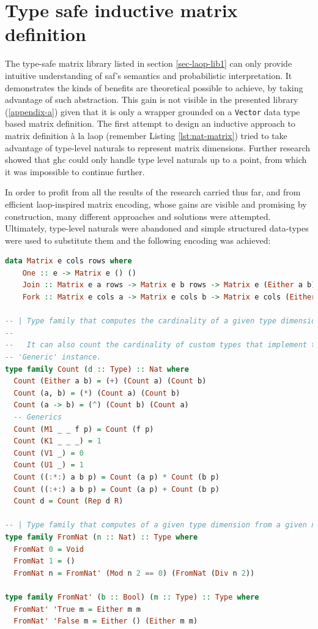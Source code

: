 \documentclass[
  oneside,
  11pt, a4paper,
  footinclude=true,
  headinclude=true,
  cleardoublepage=empty
]{scrbook}
\theoremstyle{definition}
\theoremstyle{definition}
\begin{document}
	\section{Type safe inductive matrix definition}
	    
        The type-safe matrix library listed in section \ref{sec-laop-lib1} can only provide intuitive understanding of \gls{saf}'s semantics and probabilistic interpretation. It demonstrates the kinds of benefits are theoretical possible to achieve, by taking advantage of such abstraction. This gain is not visible in the presented library (\ref{appendix-a}) given that it is only a wrapper grounded on a \texttt{Vector} data type based matrix definition. The first attempt to design an inductive approach to matrix definition à la \gls{laop} (remember Listing \ref{lst:nat-matrix}) tried to take advantage of type-level naturals to represent matrix dimensions. Further research showed that \gls{ghc} could only handle type level naturals up to a point, from which it was impossible to continue further.
	    
	    In order to profit from all the results of the research carried thus far, and from efficient \gls{laop}-inspired matrix encoding, whose gains are visible and promising by construction, many different approaches and solutions were attempted. Ultimately, type-level naturals were abandoned and simple structured data-types were used to substitute them and the following encoding was achieved:
	    
        \begin{lstlisting}[language=Haskell,label={lst:type-fam}, caption={Inductive Matrix definition},captionpos=b]
data Matrix e cols rows where
    One :: e -> Matrix e () ()
    Join :: Matrix e a rows -> Matrix e b rows -> Matrix e (Either a b) rows
    Fork :: Matrix e cols a -> Matrix e cols b -> Matrix e cols (Either a b)

-- | Type family that computes the cardinality of a given type dimension.
--
--   It can also count the cardinality of custom types that implement the
-- 'Generic' instance.
type family Count (d :: Type) :: Nat where
  Count (Either a b) = (+) (Count a) (Count b)
  Count (a, b) = (*) (Count a) (Count b)
  Count (a -> b) = (^) (Count b) (Count a)
  -- Generics
  Count (M1 _ _ f p) = Count (f p)
  Count (K1 _ _ _) = 1
  Count (V1 _) = 0
  Count (U1 _) = 1
  Count ((:*:) a b p) = Count (a p) * Count (b p)
  Count ((:+:) a b p) = Count (a p) + Count (b p)
  Count d = Count (Rep d R)

-- | Type family that computes of a given type dimension from a given natural
type family FromNat (n :: Nat) :: Type where
  FromNat 0 = Void
  FromNat 1 = ()
  FromNat n = FromNat' (Mod n 2 == 0) (FromNat (Div n 2))

type family FromNat' (b :: Bool) (m :: Type) :: Type where
  FromNat' 'True m = Either m m
  FromNat' 'False m = Either () (Either m m)
        \end{lstlisting}{}
	    
\end{document}
